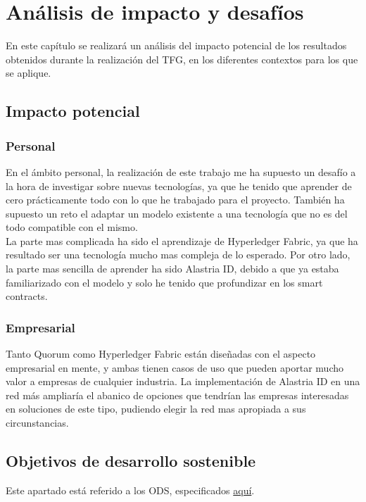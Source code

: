 \chapter{Análisis de impacto y desafíos}
En este capítulo se realizará un análisis del impacto potencial de los resultados obtenidos durante la realización del TFG, en los diferentes contextos para los que se aplique.
\section{Impacto potencial}
\subsection{Personal}
En el ámbito personal, la realización de este trabajo me ha supuesto un desafío a la hora de investigar sobre nuevas tecnologías, ya que he tenido que aprender de cero prácticamente todo con lo que he trabajado para el proyecto. También ha supuesto un reto el adaptar un modelo existente a una tecnología que no es del todo compatible con el mismo.\\
La parte mas complicada ha sido el aprendizaje de Hyperledger Fabric, ya que ha resultado ser una tecnología mucho mas compleja de lo esperado. Por otro lado, la parte mas sencilla de aprender ha sido Alastria ID, debido a que ya estaba familiarizado con el modelo y solo he tenido que profundizar en los smart contracts.
\subsection{Empresarial}
Tanto Quorum como Hyperledger Fabric están diseñadas con el aspecto empresarial en mente, y ambas tienen casos de uso que pueden aportar mucho valor a empresas de cualquier industria. La implementación de Alastria ID en una red más ampliaría el abanico de opciones que tendrían las empresas interesadas en soluciones de este tipo, pudiendo elegir la red mas apropiada a sus circunstancias.

\section{Objetivos de desarrollo sostenible}
Este apartado está referido a los ODS, especificados \href{https://www.un.org/sustainabledevelopment/es/objetivos-de-desarrollo-sostenible/}{aquí}.
